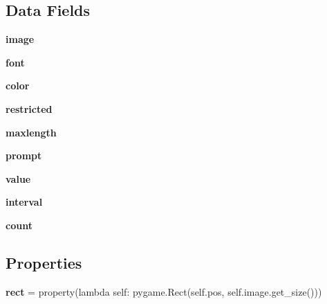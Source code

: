 \subsection*{Data Fields}
\begin{DoxyCompactItemize}
\item 
\hypertarget{classeztext_1_1Input_a0996aabc63472676f772aea1a9f27081}{{\bfseries image}}\label{classeztext_1_1Input_a0996aabc63472676f772aea1a9f27081}

\item 
\hypertarget{classeztext_1_1Input_a306861868dafd159952b984f79bf1175}{{\bfseries font}}\label{classeztext_1_1Input_a306861868dafd159952b984f79bf1175}

\item 
\hypertarget{classeztext_1_1Input_a2c241660cdcedfd4d90ac9f73527f673}{{\bfseries color}}\label{classeztext_1_1Input_a2c241660cdcedfd4d90ac9f73527f673}

\item 
\hypertarget{classeztext_1_1Input_a13049695a51f7d3479c1e074641dbe64}{{\bfseries restricted}}\label{classeztext_1_1Input_a13049695a51f7d3479c1e074641dbe64}

\item 
\hypertarget{classeztext_1_1Input_a286491ee2241f267e0476ba3905f2734}{{\bfseries maxlength}}\label{classeztext_1_1Input_a286491ee2241f267e0476ba3905f2734}

\item 
\hypertarget{classeztext_1_1Input_a0d327652a422666c95a296fc376ad847}{{\bfseries prompt}}\label{classeztext_1_1Input_a0d327652a422666c95a296fc376ad847}

\item 
\hypertarget{classeztext_1_1Input_ac091cb15a7216b7c55b9bb9dbbe3bec9}{{\bfseries value}}\label{classeztext_1_1Input_ac091cb15a7216b7c55b9bb9dbbe3bec9}

\item 
\hypertarget{classeztext_1_1Input_a2717ee392a2a1073844eb021a7bb13b4}{{\bfseries interval}}\label{classeztext_1_1Input_a2717ee392a2a1073844eb021a7bb13b4}

\item 
\hypertarget{classeztext_1_1Input_ae1e813ab90401296c553366592280e3f}{{\bfseries count}}\label{classeztext_1_1Input_ae1e813ab90401296c553366592280e3f}

\end{DoxyCompactItemize}
\subsection*{Properties}
\begin{DoxyCompactItemize}
\item 
\hypertarget{classeztext_1_1Input_a865b332dd809f3cf4df5891e92ebabe8}{{\bfseries rect} = property(lambda self\-: pygame.\-Rect(self.\-pos, self.\-image.\-get\-\_\-size()))}\label{classeztext_1_1Input_a865b332dd809f3cf4df5891e92ebabe8}

\end{DoxyCompactItemize}


